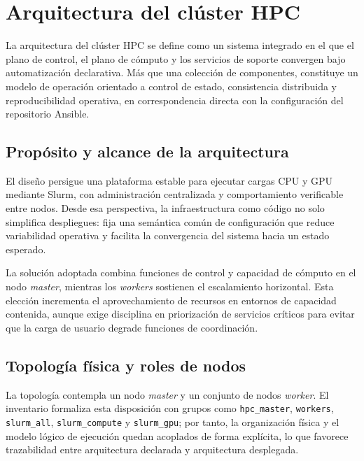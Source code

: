 \chapter{Arquitectura del clúster HPC}
\label{chap:arquitectura_hpc}

La arquitectura del clúster HPC se define como un sistema integrado en el que el plano de control, el plano de cómputo y los servicios de soporte convergen bajo automatización declarativa. Más que una colección de componentes, constituye un modelo de operación orientado a control de estado, consistencia distribuida y reproducibilidad operativa, en correspondencia directa con la configuración del repositorio Ansible.

\section{Propósito y alcance de la arquitectura}
\label{sec:arq_proposito_alcance}

El diseño persigue una plataforma estable para ejecutar cargas CPU y GPU mediante Slurm, con administración centralizada y comportamiento verificable entre nodos. Desde esa perspectiva, la infraestructura como código no solo simplifica despliegues: fija una semántica común de configuración que reduce variabilidad operativa y facilita la convergencia del sistema hacia un estado esperado.

La solución adoptada combina funciones de control y capacidad de cómputo en el nodo \textit{master}, mientras los \textit{workers} sostienen el escalamiento horizontal. Esta elección incrementa el aprovechamiento de recursos en entornos de capacidad contenida, aunque exige disciplina en priorización de servicios críticos para evitar que la carga de usuario degrade funciones de coordinación.

\section{Topología física y roles de nodos}
\label{sec:arq_topologia_roles}

La topología contempla un nodo \textit{master} y un conjunto de nodos \textit{worker}. El inventario formaliza esta disposición con grupos como \texttt{hpc\_master}, \texttt{workers}, \texttt{slurm\_all}, \texttt{slurm\_compute} y \texttt{slurm\_gpu}; por tanto, la organización física y el modelo lógico de ejecución quedan acoplados de forma explícita, lo que favorece trazabilidad entre arquitectura declarada y arquitectura desplegada.

